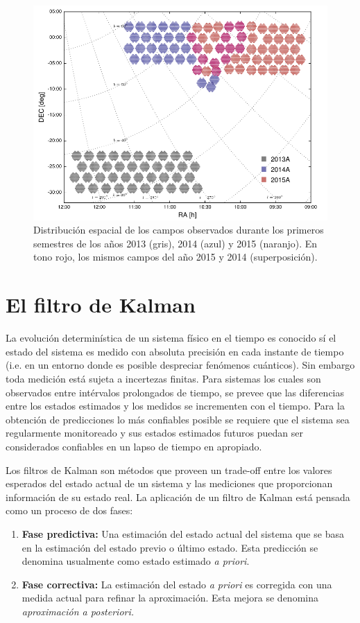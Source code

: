 \begin{figure}
\centering
\includegraphics[scale=.5]{images/fields}
\caption{Distribuci\'on espacial de los campos observados durante los primeros semestres de los a\~nos 2013 (gris), 2014 (azul) y 2015 (naranjo). En tono rojo, los mismos campos del a\~no 2015 y 2014 (superposici\'on).}
\end{figure}



\section{El filtro de Kalman}
La evoluci\'on determin\'istica de un sistema f\'isico en el tiempo es conocido s\'i el estado del sistema es medido con absoluta precisi\'on en cada instante de tiempo (i.e. en un entorno donde es posible despreciar fen\'omenos cu\'anticos). Sin embargo toda medici\'on est\'a sujeta a incertezas finitas. Para sistemas los cuales son observados entre int\'ervalos prolongados de tiempo, se prevee que las diferencias entre los estados estimados y los medidos se incrementen con el tiempo. Para la obtenci\'on de predicciones lo m\'as confiables posible se requiere que el sistema sea regularmente monitoreado y sus estados estimados futuros puedan ser considerados confiables en un lapso de tiempo en apropiado. 
\bigskip

Los filtros de Kalman son m\'etodos que proveen un trade-off entre los valores esperados del estado actual de un sistema y las mediciones que proporcionan informaci\'on de su estado real. La aplicaci\'on de un filtro de Kalman est\'a pensada como un proceso de dos fases:
\begin{enumerate}
\item \textbf{Fase predictiva:} Una estimaci\'on del estado actual del sistema que se basa en la estimaci\'on del estado previo o \'ultimo estado. Esta predicci\'on se denomina usualmente como estado estimado \textit{a priori}. 
\item \textbf{Fase correctiva:} La estimaci\'on del estado \textit{a priori} es corregida con una medida actual para refinar la aproximaci\'on. Esta mejora se denomina \textit{aproximaci\'on a posteriori.}
\end{enumerate}

